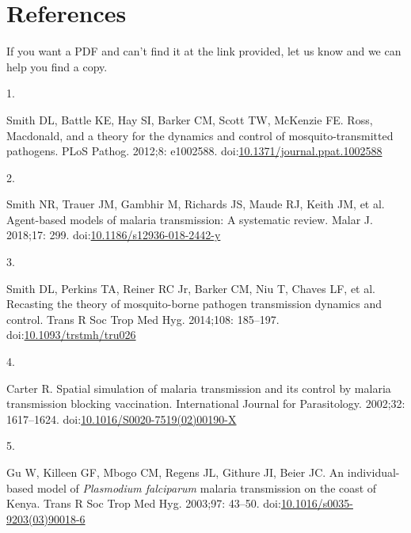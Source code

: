 \documentclass[
]{book}
\newlength{\cslhangindent}
\newlength{\csllabelwidth}
\newlength{\cslentryspacingunit} %
\newenvironment{CSLReferences}[2] %
 {%
  \setlength{\parindent}{0pt}
  \ifodd #1
  \let\oldpar\par
  \def\par{\hangindent=\cslhangindent\oldpar}
  \fi
  \setlength{\parskip}{#2\cslentryspacingunit}
 }%
 {}
\newcommand{\CSLLeftMargin}[1]{\parbox[t]{\csllabelwidth}{#1}}
\newcommand{\CSLRightInline}[1]{\parbox[t]{\linewidth - \csllabelwidth}{#1}\break}
\begin{document}
\hypertarget{references}{%
\chapter{References}\label{references}}

If you want a PDF and can't find it at the link provided, let us know and we can help you find a copy.

\hypertarget{refs}{}
\begin{CSLReferences}{0}{0}
\leavevmode{}%
\CSLLeftMargin{1. }%
\CSLRightInline{Smith DL, Battle KE, Hay SI, Barker CM, Scott TW, McKenzie FE. Ross, {Macdonald}, and a theory for the dynamics and control of mosquito-transmitted pathogens. PLoS Pathog. 2012;8: e1002588. doi:\href{https://doi.org/10.1371/journal.ppat.1002588}{10.1371/journal.ppat.1002588}}

\leavevmode{}%
\CSLLeftMargin{2. }%
\CSLRightInline{Smith NR, Trauer JM, Gambhir M, Richards JS, Maude RJ, Keith JM, et al. Agent-based models of malaria transmission: {A} systematic review. Malar J. 2018;17: 299. doi:\href{https://doi.org/10.1186/s12936-018-2442-y}{10.1186/s12936-018-2442-y}}

\leavevmode{}%
\CSLLeftMargin{3. }%
\CSLRightInline{Smith DL, Perkins TA, Reiner RC Jr, Barker CM, Niu T, Chaves LF, et al. Recasting the theory of mosquito-borne pathogen transmission dynamics and control. Trans R Soc Trop Med Hyg. 2014;108: 185--197. doi:\href{https://doi.org/10.1093/trstmh/tru026}{10.1093/trstmh/tru026}}

\leavevmode{}%
\CSLLeftMargin{4. }%
\CSLRightInline{Carter R. Spatial simulation of malaria transmission and its control by malaria transmission blocking vaccination. International Journal for Parasitology. 2002;32: 1617--1624. doi:\href{https://doi.org/10.1016/S0020-7519(02)00190-X}{10.1016/S0020-7519(02)00190-X}}

\leavevmode{}%
\CSLLeftMargin{5. }%
\CSLRightInline{Gu W, Killeen GF, Mbogo CM, Regens JL, Githure JI, Beier JC. An individual-based model of \emph{{Plasmodium} falciparum} malaria transmission on the coast of {Kenya}. Trans R Soc Trop Med Hyg. 2003;97: 43--50. doi:\href{https://doi.org/10.1016/s0035-9203(03)90018-6}{10.1016/s0035-9203(03)90018-6}}


\end{CSLReferences}
\end{document}
